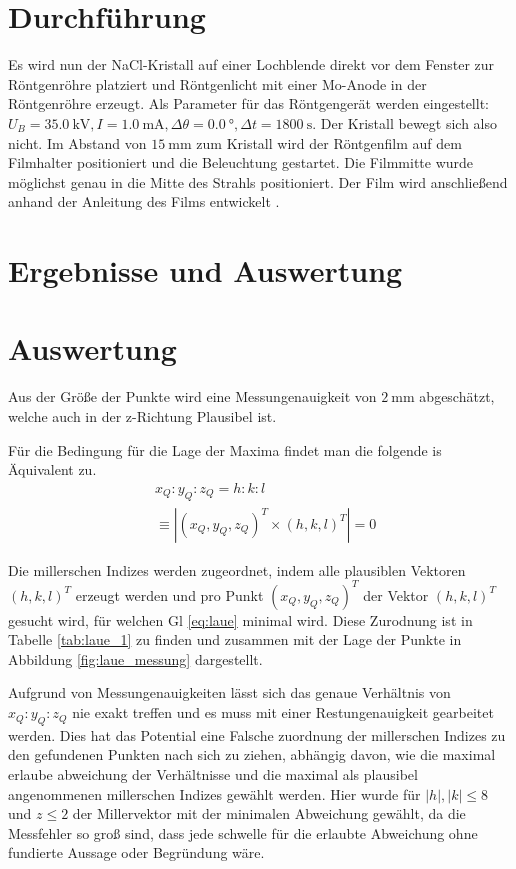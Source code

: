 

\section{Durchführung}


Es wird nun der NaCl-Kristall auf einer Lochblende direkt vor dem Fenster zur Röntgenröhre platziert und Röntgenlicht mit einer Mo-Anode in der Röntgenröhre erzeugt. Als Parameter für das Röntgengerät werden eingestellt: $U_B=\SI{35,0}{\kilo\V}, I=\SI{1,0}{\milli\A}, \Delta \theta = \SI{0,0}{\degree}, \Delta t = \SI{1800}{\second}$. Der Kristall bewegt sich also nicht. Im Abstand von $\SI{15}{\milli\meter}$ zum Kristall wird der Röntgenfilm auf dem Filmhalter positioniert und die Beleuchtung gestartet. Die Filmmitte wurde möglichst genau in die Mitte des Strahls positioniert. Der Film wird anschließend anhand der Anleitung des Films entwickelt \cite{Versuchsanleitung428}.

\section{Ergebnisse und Auswertung}


\section{Auswertung}

Aus der Größe der Punkte wird eine Messungenauigkeit von $\SI{2}{\milli\meter}$ abgeschätzt, welche auch in der z-Richtung Plausibel ist.


Für die Bedingung für die Lage der Maxima findet man die folgende is Äquivalent zu.
\begin{align}
	& x_Q : y_Q : z_Q = h : k : l \\
	& \equiv |(x_Q, y_Q, z_Q)^T \times (h, k, l)^T| = 0 \label{eq:laue}
\end{align}

Die millerschen Indizes werden zugeordnet, indem alle plausiblen Vektoren $(h, k, l)^T$ erzeugt werden und pro Punkt $(x_Q, y_Q, z_Q)^T$ der Vektor $(h, k, l)^T$ gesucht wird, für welchen Gl \eqref{eq:laue} minimal wird. Diese Zurodnung ist in Tabelle \ref{tab:laue_1} zu finden und zusammen mit der Lage der Punkte in Abbildung \ref{fig:laue_messung} dargestellt.

Aufgrund von Messungenauigkeiten lässt sich das genaue Verhältnis von $x_Q : y_Q : z_Q$ nie exakt treffen und es muss mit einer Restungenauigkeit gearbeitet werden. Dies hat das Potential eine Falsche zuordnung der millerschen Indizes zu den gefundenen Punkten nach sich zu ziehen, abhängig davon, wie die maximal erlaube abweichung der Verhältnisse und die maximal als plausibel angenommenen millerschen Indizes gewählt werden. Hier wurde für $|h|, |k| \le 8$ und $z \le 2$ der Millervektor mit der minimalen Abweichung gewählt, da die Messfehler so groß sind, dass jede schwelle für die erlaubte Abweichung ohne fundierte Aussage oder Begründung wäre.

